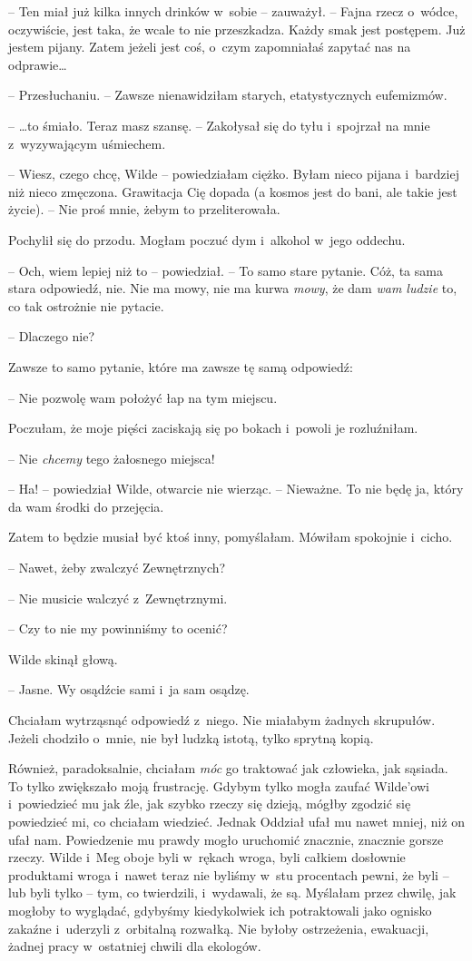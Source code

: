 \documentclass[oneside,polish,11pt,sfheadings]{mwbk}
\begin{document}
-- Ten miał
już kilka innych drinków w~sobie -- zauważył. -- Fajna rzecz o~wódce,
oczywiście, jest taka, że wcale to nie przeszkadza. Każdy smak jest
postępem. Już jestem pijany. Zatem jeżeli jest coś, o~czym zapomniałaś
zapytać nas na odprawie\ldots 

-- Przesłuchaniu. -- Zawsze nienawidziłam starych, etatystycznych eufemizmów.

-- \ldots  to śmiało. Teraz masz szansę. -- Zakołysał się do tyłu i~spojrzał
na mnie z~wyzywającym uśmiechem.

-- Wiesz, czego chcę, Wilde -- powiedziałam ciężko. Byłam nieco pijana i~bardziej niż nieco zmęczona. Grawitacja Cię dopada (a kosmos jest do
bani, ale takie jest życie). -- Nie proś mnie, żebym to przeliterowała.

Pochylił się do przodu. Mogłam poczuć dym i~alkohol w~jego oddechu.

-- Och, wiem lepiej niż to -- powiedział. -- To samo stare pytanie. Cóż, ta
sama stara odpowiedź, nie. Nie ma mowy, nie ma kurwa \textit{mowy}, że dam
\textit{wam ludzie} to, co tak ostrożnie nie pytacie.

-- Dlaczego nie?

Zawsze to samo pytanie, które ma zawsze tę samą odpowiedź:

-- Nie pozwolę wam położyć łap na tym miejscu.

Poczułam, że moje pięści zaciskają się po bokach i~powoli je
rozluźniłam.

-- Nie \textit{chcemy} tego żałosnego miejsca!

-- Ha! -- powiedział Wilde, otwarcie nie wierząc. -- Nieważne. To nie będę
ja, który da wam środki do przejęcia.

Zatem to będzie musiał być ktoś inny, pomyślałam. Mówiłam spokojnie i~cicho.

-- Nawet, żeby zwalczyć Zewnętrznych?

-- Nie musicie walczyć z~Zewnętrznymi.

-- Czy to nie my powinniśmy to ocenić?

Wilde skinął głową. 

-- Jasne. Wy osądźcie sami i~ja sam osądzę.

Chciałam wytrząsnąć odpowiedź z~niego. Nie miałabym żadnych skrupułów.
Jeżeli chodziło o~mnie, nie był ludzką istotą, tylko sprytną kopią.

Również, paradoksalnie, chciałam \textit{móc} go traktować jak człowieka,
jak sąsiada. To tylko zwiększało moją frustrację. Gdybym tylko mogła
zaufać Wilde'owi i~powiedzieć mu jak źle, jak szybko rzeczy się dzieją,
mógłby zgodzić się powiedzieć mi, co chciałam wiedzieć. Jednak Oddział
ufał mu nawet mniej, niż on ufał nam. Powiedzenie mu prawdy mogło
uruchomić znacznie, znacznie gorsze rzeczy. Wilde i~Meg oboje byli w~rękach wroga, byli całkiem dosłownie produktami wroga i~nawet teraz nie
byliśmy w~stu procentach pewni, że byli -- lub byli tylko -- tym, co
twierdzili, i~wydawali, że są. Myślałam przez chwilę, jak mogłoby to
wyglądać, gdybyśmy kiedykolwiek ich potraktowali jako ognisko zakaźne i~uderzyli z~orbitalną rozwałką. Nie byłoby ostrzeżenia, ewakuacji, żadnej
pracy w~ostatniej chwili dla ekologów.
\end{document}
